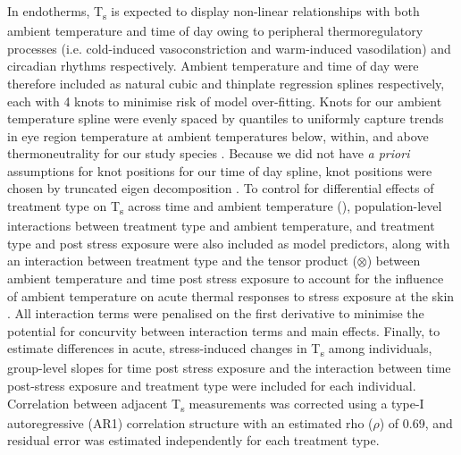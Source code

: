 \documentclass[12pt]{article}
\begin{document}
\noindent In endotherms, T\textsubscript{s} is expected to display non-linear relationships with both ambient temperature and time of day owing to peripheral thermoregulatory processes (i.e. cold-induced vasoconstriction and warm-induced vasodilation) and circadian rhythms \citep{richards_1971,cooper_2005} respectively. Ambient temperature and time of day were therefore included as natural cubic and thinplate regression splines respectively, each with 4 knots to minimise risk of model over-fitting. Knots for our ambient temperature spline were evenly spaced by quantiles to uniformly capture trends in eye region temperature at ambient temperatures below, within, and above thermoneutrality for our study species \citep{grossman_1977}. Because we did not have \textit{a priori} assumptions for knot positions for our time of day spline, knot positions were chosen by truncated eigen decomposition \citep{wood_2003}. To control for differential effects of treatment type on T\textsubscript{s} across time \citep{jerem_2015,jerem_2019} and ambient temperature (\citealt{robertson_2020a}), population-level interactions between treatment type and ambient temperature, and treatment type and post stress exposure were also included as model predictors, along with an interaction between treatment type and the tensor product ($\otimes$) between ambient temperature and time post stress exposure to account for the influence of ambient temperature on acute thermal responses to stress exposure at the skin \citep{nord_2019b}. All interaction terms were penalised on the first derivative to minimise the potential for concurvity between interaction terms and main effects. Finally, to estimate differences in acute, stress-induced changes in T\textsubscript{s} among individuals, group-level slopes for time post stress exposure and the interaction between time post-stress exposure and treatment type were included for each individual. Correlation between adjacent T\textsubscript{s} measurements was corrected using a type-I autoregressive (AR1) correlation structure with an estimated rho ($\rho$) of 0.69, and residual error was estimated independently for each treatment type. \vspace{1cm} 
\end{document}
